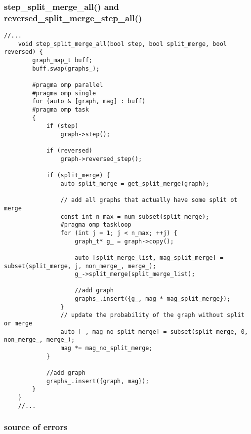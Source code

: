 \documentclass[11pt]{article}
\begin{document}
\subsubsection{step\_split\_merge\_all() and reversed\_split\_merge\_step\_all()}

\begin{lstlisting}[style=CStyle]
	//...
	void step_split_merge_all(bool step, bool split_merge, bool reversed) {
		graph_map_t buff;
		buff.swap(graphs_);

		#pragma omp parallel
		#pragma omp single
	  	for (auto & [graph, mag] : buff)
		#pragma omp task
	  	{
	  		if (step)
	  			graph->step();

	  		if (reversed)
	  			graph->reversed_step();

	  		if (split_merge) {
	  			auto split_merge = get_split_merge(graph);

				// add all graphs that actually have some split ot merge 
				const int n_max = num_subset(split_merge);
				#pragma omp taskloop
				for (int j = 1; j < n_max; ++j) {
					graph_t* g_ = graph->copy();

					auto [split_merge_list, mag_split_merge] = subset(split_merge, j, non_merge_, merge_);
				  	g_->split_merge(split_merge_list);

				  	//add graph
				  	graphs_.insert({g_, mag * mag_split_merge});
				}
				// update the probability of the graph without split or merge 
				auto [_, mag_no_split_merge] = subset(split_merge, 0, non_merge_, merge_);
				mag *= mag_no_split_merge;
	  		}
	  		
	  		//add graph
			graphs_.insert({graph, mag});
	  	}
	}
	//...
\end{lstlisting}

\subsubsection{source of errors}
\end{document}
